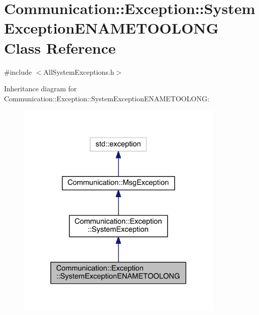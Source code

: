 \hypertarget{class_communication_1_1_exception_1_1_system_exception_e_n_a_m_e_t_o_o_l_o_n_g}{}\section{Communication\+:\+:Exception\+:\+:System\+Exception\+E\+N\+A\+M\+E\+T\+O\+O\+L\+O\+N\+G Class Reference}
\label{class_communication_1_1_exception_1_1_system_exception_e_n_a_m_e_t_o_o_l_o_n_g}


{\ttfamily \#include $<$All\+System\+Exceptions.\+h$>$}



Inheritance diagram for Communication\+:\+:Exception\+:\+:System\+Exception\+E\+N\+A\+M\+E\+T\+O\+O\+L\+O\+N\+G\+:\nopagebreak
\begin{figure}[H]
\begin{center}
\leavevmode
\includegraphics[width=282pt]{class_communication_1_1_exception_1_1_system_exception_e_n_a_m_e_t_o_o_l_o_n_g__inherit__graph}
\end{center}
\end{figure}


